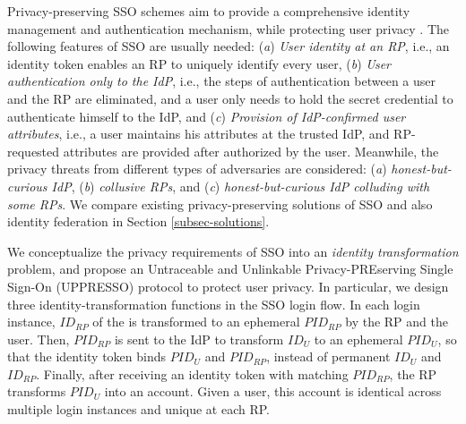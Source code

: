 Privacy-preserving SSO schemes aim to provide a comprehensive identity management and authentication mechanism,
    while protecting user privacy \cite{maler2008venn,NIST2017draft,BrowserID,SPRESSO}.
The following features of SSO are usually needed:
(\emph{a}) \emph{User identity at an RP},
    i.e., an identity token enables an RP to uniquely identify every user,
(\emph{b}) \emph{User authentication only to the IdP}, i.e.,
    the steps of authentication between a user and the RP are eliminated,
    and a user only needs to hold the secret credential to authenticate himself to the IdP,
and (\emph{c}) \emph{Provision of IdP-confirmed user attributes},
    i.e., a user maintains his attributes at the trusted IdP,
    and RP-requested attributes are provided %
            after authorized by the user.
Meanwhile,
    the privacy threats from different types of adversaries are considered:
    (\emph{a}) \emph{honest-but-curious IdP},
    (\emph{b}) \emph{collusive RPs},
    and (\emph{c}) \emph{honest-but-curious IdP colluding with some RPs}.
We compare existing privacy-preserving solutions of SSO and also identity federation
in Section \ref{subsec-solutions}.



We conceptualize the privacy requirements of SSO into
  an {\em identity transformation} problem, %
and propose an Untraceable and Unlinkable Privacy-PREserving Single Sign-On (UPPRESSO) protocol
  to protect user privacy.
In particular, we design three identity-transformation functions in the SSO login flow.
In each login instance,
        $ID_{RP}$ of the is transformed to an ephemeral $PID_{RP}$  by the RP and the user.
Then, $PID_{RP}$ is sent to the IdP to transform $ID_U$ to an ephemeral $PID_U$,
    so that the identity token binds $PID_U$ and $PID_{RP}$, instead of permanent $ID_U$ and $ID_{RP}$.
Finally,
    after receiving an identity token with matching $PID_{RP}$,
        the RP transforms $PID_U$ into an account.
Given a user, this account is identical across multiple login instances and unique at each RP.

